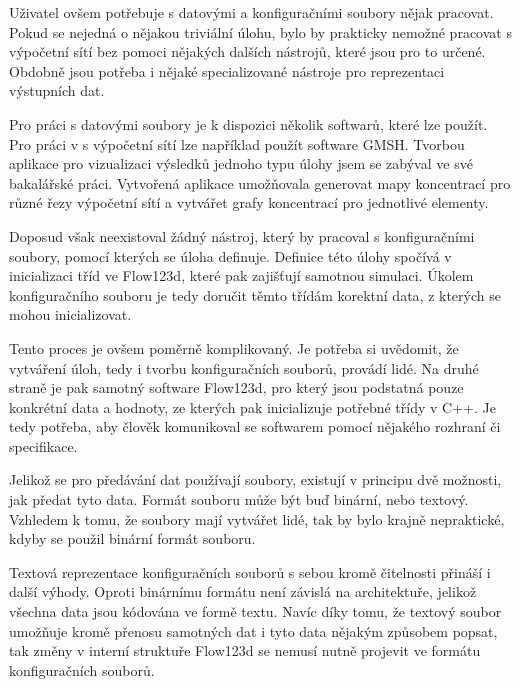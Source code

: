 \documentclass[FM,DP]{tulthesis}
\begin{document}
Uživatel ovšem potřebuje s datovými a konfiguračními soubory nějak pracovat. Pokud se nejedná o nějakou triviální úlohu, bylo by prakticky nemožné pracovat s výpočetní sítí bez pomoci nějakých dalších nástrojů, které jsou pro to určené. Obdobně jsou potřeba i nějaké specializované nástroje pro reprezentaci výstupních dat.


Pro práci s datovými soubory je k dispozici několik softwarů, které lze použít. Pro práci v s výpočetní sítí lze například použít software GMSH. Tvorbou aplikace pro vizualizaci výsledků jednoho typu úlohy jsem se zabýval ve své bakalářské práci. Vytvořená aplikace umožňovala generovat mapy koncentrací pro různé řezy výpočetní sítí a vytvářet grafy koncentrací pro jednotlivé elementy.

Doposud však neexistoval žádný nástroj, který by pracoval s konfiguračními soubory, pomocí kterých se úloha definuje. Definice této úlohy spočívá v inicializaci tříd ve Flow123d, které pak zajišťují samotnou simulaci. Úkolem konfiguračního souboru je tedy doručit těmto třídám korektní data, z kterých se mohou inicializovat.

Tento proces je ovšem poměrně komplikovaný. Je potřeba si uvědomit, že vytváření úloh, tedy i tvorbu konfiguračních souborů, provádí lidé. Na druhé straně je pak samotný software Flow123d, pro který jsou podstatná pouze konkrétní data a hodnoty, ze kterých pak inicializuje potřebné třídy v C++. Je tedy potřeba, aby člověk komunikoval se softwarem pomocí nějakého rozhraní či specifikace.

Jelikož se pro předávání dat používají soubory, existují v principu dvě možnosti, jak předat tyto data. Formát souboru může být buď binární, nebo textový. Vzhledem k tomu, že soubory mají vytvářet lidé, tak by bylo krajně nepraktické, kdyby se použil binární formát souboru.

Textová reprezentace konfiguračních souborů s sebou kromě čitelnosti přináší i další výhody. Oproti binárnímu formátu není závislá na architektuře, jelikož všechna data jsou kódována ve formě textu. Navíc díky tomu, že textový soubor umožňuje kromě přenosu samotných dat i tyto data nějakým způsobem popsat, tak změny v interní struktuře Flow123d se nemusí nutně projevit ve formátu konfiguračních souborů.
\end{document}
